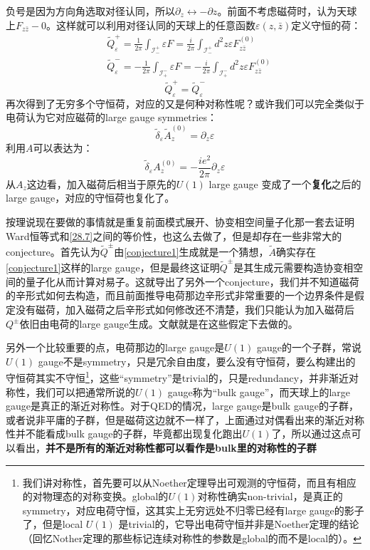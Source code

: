 负号是因为方向角选取对径认同，所以$\partial_z\leftrightarrow-\partial z$。前面不考虑磁荷时，认为天球上$F_{z\bar z}-0$。这样就可以利用对径认同的天球上的任意函数$\varepsilon(z,\bar z)$定义守恒的荷：
\begin{align}
	&\tilde{Q}_{\varepsilon}^{+}=\frac{1}{2\pi}\int_{\mathcal I_{-}^{+}}\varepsilon F=\frac{i}{2\pi}\int_{\mathcal I_{-}^{+}}d^{2}z\varepsilon F_{z\bar{z}}^{(0)}\\
	&\tilde{Q}_{\varepsilon}^{-}=-\frac{1}{2\pi}\int_{\mathcal I_{+}^{-}}\varepsilon F=-\frac{i}{2\pi}\int_{\mathcal I_{+}^{-}}d^{2}z\varepsilon F_{z\bar{z}}^{(0)}
\end{align}
\begin{equation}
	\boxed{
		\tilde{Q}_{\varepsilon}^+=\tilde{Q}_{\varepsilon}^-
	}
\end{equation}
再次得到了无穷多个守恒荷，对应的又是何种对称性呢？或许我们可以完全类似于电荷认为它对应磁荷的large gauge symmetries：
\begin{equation}\label{conjecture1}
	\tilde{\delta}_\varepsilon\tilde{A}_z^{(0)}=\partial_z\varepsilon
\end{equation}
利用$A$可以表达为：
\begin{equation}
	\tilde\delta_{\varepsilon}A_{z}^{(0)}=-\frac{ie^{2}}{2\pi}\partial_{z}\varepsilon 
\end{equation}
从$A_z$这边看，加入磁荷后相当于原先的$U(1)$ large gauge 变成了一个\textbf{复化}之后的large gauge，对应的守恒荷也复化了。

按理说现在要做的事情就是重复前面模式展开、协变相空间量子化那一套去证明Ward恒等式和\ref{28.7}之间的等价性，\cite{Strominger:2015bla}也这么去做了，但是却存在一些非常大的conjecture。首先认为$\tilde{Q}^\pm$由\ref{conjecture1}生成就是一个猜想，$\tilde{A}$确实存在\ref{conjecture1}这样的large gauge，但是最终这证明$\tilde{Q}^\pm$是其生成元需要构造协变相空间的量子化从而计算对易子。这就导出了另外一个conjecture，我们并不知道磁荷的辛形式如何去构造，而且前面推导电荷那边辛形式非常重要的一个边界条件是假定没有磁荷，加入磁荷之后辛形式如何修改还不清楚，我们只能认为加入磁荷后$Q^\pm$依旧由电荷的large gauge生成。文献\cite{Strominger:2015bla}就是在这些假定下去做的。

另外一个比较重要的点，电荷那边的large gauge是$U(1)$ gauge的一个子群，常说$U(1)$ gauge不是symmetry，只是冗余自由度，要么没有守恒荷，要么构建出的守恒荷其实不守恒\footnote{我们讲对称性，首先要可以从Noether定理导出可观测的守恒荷，而且有相应的对物理态的对称变换。global的$U(1)$对称性确实non-trivial，是真正的symmetry，对应电荷守恒，这其实上无穷远处不归零已经有large gauge的影子了，但是local $U(1)$ 是trivial的，它导出电荷守恒并非是Noether定理的结论（回忆Nother定理的那些标记连续对称性的参数是global的而不是local的）。}，这些“symmetry”是trivial的，只是redundancy，并非渐近对称性，我们可以把通常所说的$U(1)$ gauge称为“bulk gauge”，而天球上的large gauge是真正的渐近对称性。对于QED的情况，large gauge是bulk gauge的子群，或者说非平庸的子群，但是磁荷这边就不一样了，上面通过对偶看出来的渐近对称性并不能看成bulk gauge的子群，毕竟都出现复化跑出$U(1)$了，所以通过这点可以看出，\textbf{并不是所有的渐近对称性都可以看作是bulk里的对称性的子群}
